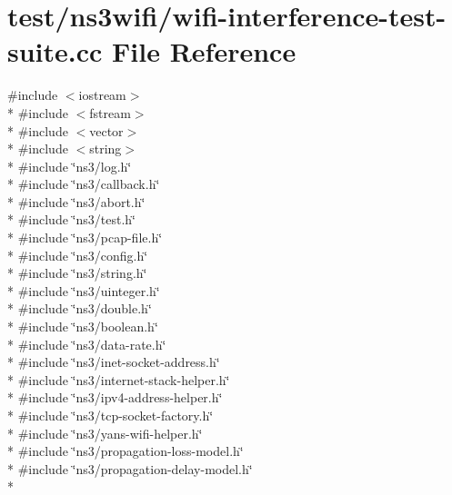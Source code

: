 \hypertarget{wifi-interference-test-suite_8cc}{}\section{test/ns3wifi/wifi-\/interference-\/test-\/suite.cc File Reference}
\label{wifi-interference-test-suite_8cc}
{\ttfamily \#include $<$iostream$>$}\\*
{\ttfamily \#include $<$fstream$>$}\\*
{\ttfamily \#include $<$vector$>$}\\*
{\ttfamily \#include $<$string$>$}\\*
{\ttfamily \#include \char`\"{}ns3/log.\+h\char`\"{}}\\*
{\ttfamily \#include \char`\"{}ns3/callback.\+h\char`\"{}}\\*
{\ttfamily \#include \char`\"{}ns3/abort.\+h\char`\"{}}\\*
{\ttfamily \#include \char`\"{}ns3/test.\+h\char`\"{}}\\*
{\ttfamily \#include \char`\"{}ns3/pcap-\/file.\+h\char`\"{}}\\*
{\ttfamily \#include \char`\"{}ns3/config.\+h\char`\"{}}\\*
{\ttfamily \#include \char`\"{}ns3/string.\+h\char`\"{}}\\*
{\ttfamily \#include \char`\"{}ns3/uinteger.\+h\char`\"{}}\\*
{\ttfamily \#include \char`\"{}ns3/double.\+h\char`\"{}}\\*
{\ttfamily \#include \char`\"{}ns3/boolean.\+h\char`\"{}}\\*
{\ttfamily \#include \char`\"{}ns3/data-\/rate.\+h\char`\"{}}\\*
{\ttfamily \#include \char`\"{}ns3/inet-\/socket-\/address.\+h\char`\"{}}\\*
{\ttfamily \#include \char`\"{}ns3/internet-\/stack-\/helper.\+h\char`\"{}}\\*
{\ttfamily \#include \char`\"{}ns3/ipv4-\/address-\/helper.\+h\char`\"{}}\\*
{\ttfamily \#include \char`\"{}ns3/tcp-\/socket-\/factory.\+h\char`\"{}}\\*
{\ttfamily \#include \char`\"{}ns3/yans-\/wifi-\/helper.\+h\char`\"{}}\\*
{\ttfamily \#include \char`\"{}ns3/propagation-\/loss-\/model.\+h\char`\"{}}\\*
{\ttfamily \#include \char`\"{}ns3/propagation-\/delay-\/model.\+h\char`\"{}}\\*
